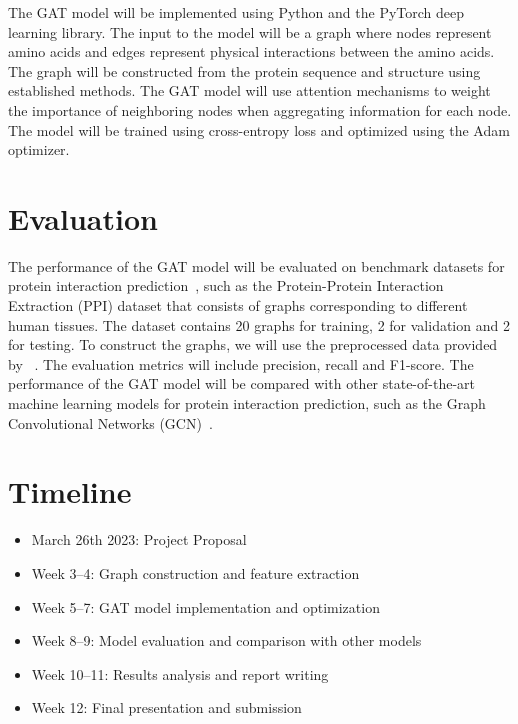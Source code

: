 \documentclass{article}
\begin{document}
    The GAT model will be implemented using Python and the PyTorch deep learning library.
    The input to the model will be a graph where nodes represent amino acids and edges represent physical interactions between the amino acids.
    The graph will be constructed from the protein sequence and structure using established methods.
    The GAT model will use attention mechanisms to weight the importance of neighboring nodes when aggregating information for each node.
    The model will be trained using cross-entropy loss and optimized using the Adam optimizer.


    \section{Evaluation}\label{sec:evaluation}

    The performance of the GAT model will be evaluated on benchmark datasets for protein interaction prediction~\cite{zitnik2017predicting},
    such as the Protein-Protein Interaction Extraction (PPI) dataset that consists of graphs corresponding to different human tissues.
    The dataset contains 20 graphs for training, 2 for validation and 2 for testing.
    To construct the graphs, we will use the preprocessed data provided by ~\cite{hamilton2017inductive}.
    The evaluation metrics will include precision, recall and F1-score.
    The performance of the GAT model will be compared with other state-of-the-art machine learning models for protein interaction prediction,
    such as the Graph Convolutional Networks (GCN)~\cite{kipf2016semi}.


    \section{Timeline}\label{sec:timeline}

    \begin{itemize}
        \item March 26th 2023: Project Proposal
        \item Week 3--4: Graph construction and feature extraction
        \item Week 5--7: GAT model implementation and optimization
        \item Week 8--9: Model evaluation and comparison with other models
        \item Week 10--11: Results analysis and report writing
        \item Week 12: Final presentation and submission
    \end{itemize}
\end{document}

